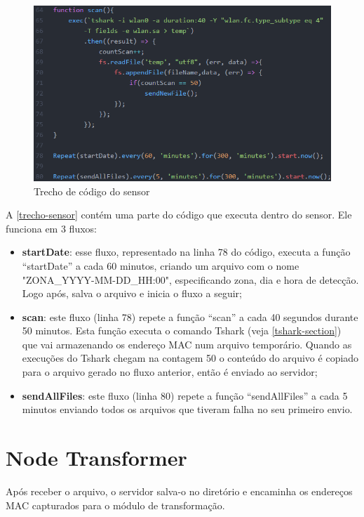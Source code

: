\begin{figure}[!h]
  \caption{\label{trecho-sensor}Trecho de código do sensor}
  \begin{center}
    \includegraphics[width=1.0\textwidth]{img/sensor.png}
  \end{center}
\end{figure}

A \autoref{trecho-sensor} contém uma parte do código que executa dentro do
sensor. Ele funciona em 3 fluxos:

\begin{itemize}
    \item \textbf{startDate}: esse fluxo, representado na linha 78
    do código, executa a função ``startDate'' a cada 60 minutos, criando um arquivo com
    o nome "ZONA\_YYYY-MM-DD\_HH:00", especificando zona, dia e hora de detecção. Logo
    após, salva o arquivo e inicia o fluxo a seguir;
    \item \textbf{scan}: este fluxo (linha 78) repete a função ``scan'' a cada 40 segundos durante 50 minutos. Esta função executa o
    comando Tshark (veja \autoref{tshark-section}) que vai armazenando os endereço
    MAC num arquivo temporário. Quando as execuções do Tshark chegam na contagem 50
    o conteúdo do arquivo  é copiado para o arquivo gerado no fluxo anterior, então é enviado ao servidor;
    \item \textbf{sendAllFiles}: este fluxo (linha 80) repete a função ``sendAllFiles'' a cada 5 minutos enviando todos os arquivos que tiveram falha no seu
    primeiro envio.
\end{itemize}

\section{Node Transformer}
\label{node-transformer}
Após receber o arquivo, o servidor salva-o no diretório e encaminha os endereços MAC capturados para o
módulo de transformação.

